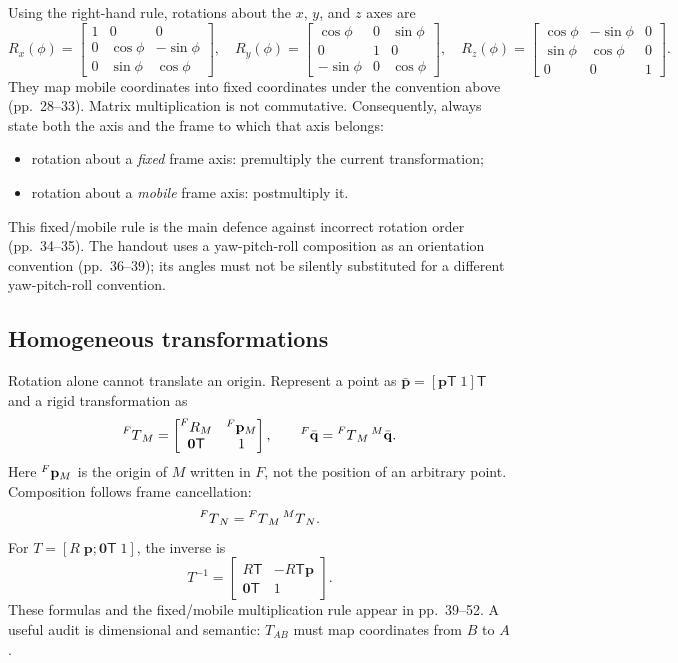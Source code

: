 \documentclass[11pt,a4paper]{article}
\newcommand{\trans}{\mathsf{T}}
\begin{document}
Using the right-hand rule, rotations about the $x$, $y$, and $z$ axes are
\[
R_x(\phi)=\begin{bmatrix}1&0&0\\0&\cos\phi&-\sin\phi\\0&\sin\phi&\cos\phi\end{bmatrix},\quad
R_y(\phi)=\begin{bmatrix}\cos\phi&0&\sin\phi\\0&1&0\\-\sin\phi&0&\cos\phi\end{bmatrix},\quad
R_z(\phi)=\begin{bmatrix}\cos\phi&-\sin\phi&0\\\sin\phi&\cos\phi&0\\0&0&1\end{bmatrix}.
\]
They map mobile coordinates into fixed coordinates under the convention above (pp.~28--33). Matrix multiplication is not commutative. Consequently, always state both the axis and the frame to which that axis belongs:
\begin{itemize}
  \item rotation about a \emph{fixed} frame axis: premultiply the current transformation;
  \item rotation about a \emph{mobile} frame axis: postmultiply it.
\end{itemize}
This fixed/mobile rule is the main defence against incorrect rotation order (pp.~34--35). The handout uses a yaw-pitch-roll composition as an orientation convention (pp.~36--39); its angles must not be silently substituted for a different yaw-pitch-roll convention.

\subsection{Homogeneous transformations}

Rotation alone cannot translate an origin. Represent a point as $\bar{\mathbf p}=[\mathbf p\trans\;1]\trans$ and a rigid transformation as
\[
  \prescript{F}{}{T}_{M}=
  \begin{bmatrix}
    \prescript{F}{}{R}_{M} & \prescript{F}{}{\mathbf p}_{M}\\
    \mathbf 0\trans & 1
  \end{bmatrix},
  \qquad
  \prescript{F}{}{\bar{\mathbf q}}=
  \prescript{F}{}{T}_{M}\prescript{M}{}{\bar{\mathbf q}}.
\]
Here $\prescript{F}{}{\mathbf p}_{M}$ is the origin of $M$ written in $F$, not the position of an arbitrary point. Composition follows frame cancellation:
\[
  \prescript{F}{}{T}_{N}=\prescript{F}{}{T}_{M}\prescript{M}{}{T}_{N}.
\]
For $T=[R\;\mathbf p;\mathbf0\trans\;1]$, the inverse is
\[
  T^{-1}=\begin{bmatrix}R\trans&-R\trans\mathbf p\\\mathbf0\trans&1\end{bmatrix}.
\]
These formulas and the fixed/mobile multiplication rule appear in pp.~39--52. A useful audit is dimensional and semantic: $T_{AB}$ must map coordinates from $B$ to $A$.
\end{document}
